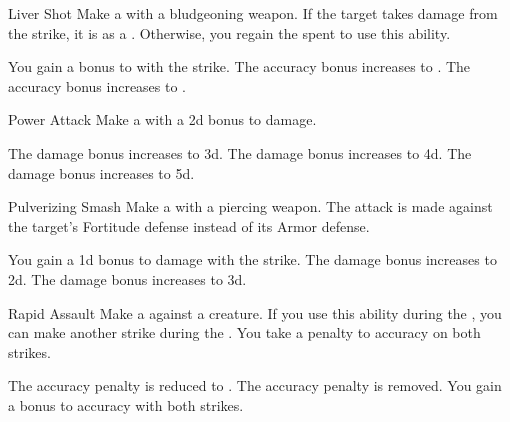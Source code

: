 {            \begin{apability}{Liver Shot}
                Make a  with a bludgeoning weapon.
                If the target takes damage from the strike, it is \sickened as a .
                Otherwise, you regain the  spent to use this ability.

                \rankline
                 You gain a  bonus to  with the strike.
                 The accuracy bonus increases to .
                 The accuracy bonus increases to .
            \end{apability}

            \begin{apability}{Power Attack}
                Make a  with a \plus2d bonus to damage.

                \rankline
                 The damage bonus increases to \plus3d.
                 The damage bonus increases to \plus4d.
                 The damage bonus increases to \plus5d.
            \end{apability}

            \begin{apability}{Pulverizing Smash}
                Make a  with a piercing weapon.
                The attack is made against the target's Fortitude defense instead of its Armor defense.

                \rankline
                 You gain a \plus1d bonus to damage with the strike.
                 The damage bonus increases to \plus2d.
                 The damage bonus increases to \plus3d.
            \end{apability}

            \begin{apability}{Rapid Assault}
                Make a  against a creature.
                If you use this ability during the , you can make another strike during the .
                You take a  penalty to accuracy on both strikes.

                \rankline
                 The accuracy penalty is reduced to .
                 The accuracy penalty is removed.
                 You gain a  bonus to accuracy with both strikes.
            \end{apability}

}
